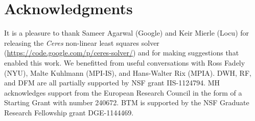 \documentclass[letterpaper,12pt,whitepaper]{haastex}
\newcommand{\project}[1]{\textsl{#1}}
\begin{document}
\section{Acknowledgments}

It is a pleasure to thank Sameer Agarwal (Google) and Keir Mierle
  (Locu) for releasing the \project{Ceres} non-linear least squares
  solver (\url{https://code.google.com/p/ceres-solver/}) and for making
  suggestions that enabled this work.
We benefitted from useful conversations with
  Ross Fadely (NYU),
  Malte Kuhlmann (MPI-IS), and
  Hans-Walter Rix (MPIA).
DWH, RF, and DFM are all partially supported by NSF grant IIS-1124794.
MH acknowledges support from the European Research Council in the form of a Starting Grant with number 240672.
BTM is supported by the NSF Graduate Research Fellowship grant DGE-1144469.
\end{document}
